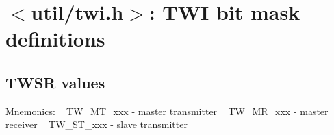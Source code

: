 \hypertarget{group__util__twi}{}\section{$<$util/twi.h$>$\+: T\+WI bit mask definitions}
\label{group__util__twi}
\subsection*{T\+W\+SR values}
\label{_amgrp42f820ba9b5b7097b4fd1e83955bb8fc}%
Mnemonics\+: ~\newline
T\+W\+\_\+\+M\+T\+\_\+xxx -\/ master transmitter ~\newline
T\+W\+\_\+\+M\+R\+\_\+xxx -\/ master receiver ~\newline
T\+W\+\_\+\+S\+T\+\_\+xxx -\/ slave transmitter ~\newline
